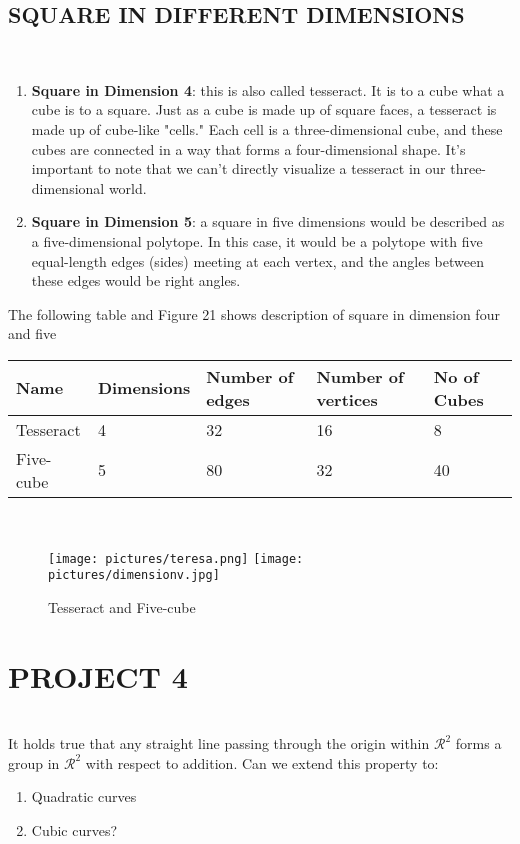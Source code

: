 \documentclass{article}
\begin{document}
\subsection{SQUARE IN DIFFERENT DIMENSIONS}\\

\begin{enumerate}
    \item \textbf{Square in Dimension 4}: this is also called  tesseract. It is to a cube what a cube is to a square. Just as a cube is made up of square faces, a tesseract is made up of cube-like "cells." Each cell is a three-dimensional cube, and these cubes are connected in a way that forms a four-dimensional shape. It's important to note that we can't directly visualize a tesseract in our three-dimensional world.

    \item \textbf{Square in Dimension 5}: a square in five dimensions would be described as a five-dimensional polytope. In this case, it would be a polytope with five equal-length edges (sides) meeting at each vertex, and the angles between these edges would be right angles.
    \end{enumerate}
The following table and Figure 21 shows description of square in dimension four and five\\

\begin{tabular}{| l | l | l |l |l |}
\hline
Name& 	Dimensions& Number of edges& Number of vertices& No of Cubes\\
\hline
Tesseract& 	4& 	32& 16& 8\\
\hline
Five-cube& 	5& 	80& 32 & 40\\
\hline
\end{tabular}\\


\begin{figure}[htp]
     \texttt{[image: pictures/teresa.png]}
     \texttt{[image: pictures/dimensionv.jpg]}
     \caption{Tesseract and Five-cube}
\end{figure}
\vspace{9cm}
\section{PROJECT 4}
\\
It holds true that any straight line passing through the origin within $\mathcal{R}^2$ forms a group in $\mathcal{R}^2$ with respect to addition. Can we extend this property to:
\begin{enumerate}
    \item Quadratic curves
    \item Cubic curves?
\end{enumerate}
\end{document}
